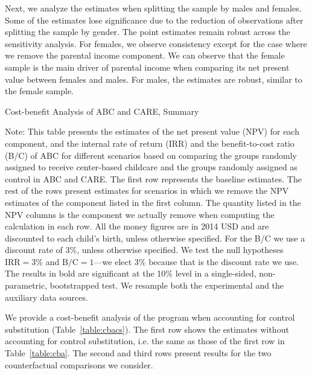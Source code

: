 Next, we analyze the estimates when splitting the sample by males and females. Some of the estimates lose significance due to the reduction of observations after splitting the sample by gender. The point estimates remain robust across  the sensitivity analysis. For females, we observe consistency except for the case where we remove the parental income component. We can observe that the female sample is the main driver of parental income when comparing its net present value between females and males. For males, the estimates are robust, similar to the female sample.

\begin{table}
\centering
\begin{threeparttable}
\caption{Cost-benefit Analysis of ABC and CARE, Summary}
\label{table:cba}
\centerline{
	\scalebox{0.85}{
		
	}
}
\begin{tablenotes}
\item Note: This table presents the estimates of the net present value (NPV) for each component, and the internal rate of return (IRR) and the benefit-to-cost ratio (B/C) of ABC for different scenarios based on comparing the groups randomly assigned to receive center-based childcare and the groups randomly assigned as control in ABC and CARE. The first row represents the baseline estimates. The rest of the rows present estimates for scenarios in which we remove the NPV estimates of the component listed in the first column. The quantity listed in the NPV columns is the component we actually remove when computing the calculation in each row. All the money figures are in 2014 USD and are discounted to each child's birth, unless otherwise specified. For the B/C we use a discount rate of $3\%$, unless otherwise specified. We test the null hypotheses $\text{IRR} = 3\%$ and $\text{B/C} = 1$---we elect $3\%$ because that is the discount rate we use. The results in bold are significant at the 10\% level in a single-sided, non-parametric, bootstrapped test. We resample both the experimental and the auxiliary data sources.
\end{tablenotes}
\end{threeparttable}
\end{table}

We provide a cost-benefit analysis of the program when accounting for control substitution (Table~\ref{table:cbacs}). The first row shows the estimates without accounting for control substitution, i.e. the same as those of the first row in Table~\ref{table:cba}. The second and third rows present results for the two counterfactual comparisons we consider.


